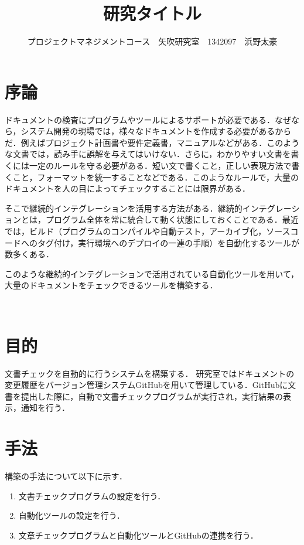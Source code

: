 \documentclass[uplatex,twocolumn,dvipdfmx]{jsarticle}
\title{\vspace{-5mm}\fontsize{14pt}{0pt}\selectfont 研究タイトル}
\author{\normalsize プロジェクトマネジメントコース　矢吹研究室　1342097　浜野太豪}
\date{}
\begin{document}
\fontsize{10.5pt}{\baselineskip}\selectfont
\maketitle





\section{序論}



\noindent

ドキュメントの検査にプログラムやツールによるサポートが必要である．なぜなら，システム開発の現場では，様々なドキュメントを作成する必要があるからだ．例えばプロジェクト計画書や要件定義書，マニュアルなどがある．このような文書では，読み手に誤解を与えてはいけない．さらに，わかりやすい文書を書くには一定のルールを守る必要がある．短い文で書くこと，正しい表現方法で書くこと，フォーマットを統一することなどである．このようなルールで，大量のドキュメントを人の目によってチェックすることには限界がある．

そこで継続的インテグレーションを活用する方法がある．継続的インテグレーションとは，プログラム全体を常に統合して動く状態にしておくことである．最近では，ビルド（プログラムのコンパイルや自動テスト，アーカイブ化，ソースコードへのタグ付け，実行環境へのデプロイの一連の手順）を自動化するツールが数多くある\cite{1}．

このような継続的インテグレーションで活用されている自動化ツールを用いて，大量のドキュメントをチェックできるツールを構築する．








　



\noindent


\section{目的}
文書チェックを自動的に行うシステムを構築する．
研究室ではドキュメントの変更履歴をバージョン管理システムGitHubを用いて管理している．GitHubに文書を提出した際に，自動で文書チェックプログラムが実行され，実行結果の表示，通知を行う．

\section{手法}
構築の手法について以下に示す．
\begin{enumerate}
\item 文書チェックプログラムの設定を行う．
\item 自動化ツールの設定を行う．
\item 文章チェックプログラムと自動化ツールとGitHubの連携を行う．
\end{enumerate}
\end{document}

